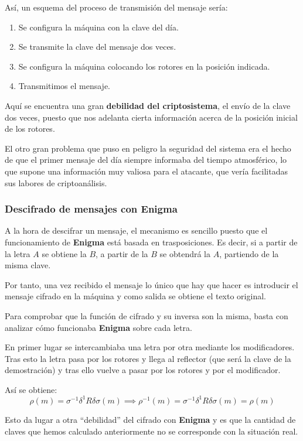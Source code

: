 \documentclass[nochap]{apuntesURJC}
\begin{document}
Así, un esquema del proceso de transmisión del mensaje sería:
\begin{enumerate}
\item Se configura la máquina con la clave del día.
\item Se transmite la clave del mensaje dos veces.
\item Se configura la máquina colocando los rotores en la posición indicada.
\item Transmitimos el mensaje.
\end{enumerate}

Aquí se encuentra una gran \textbf{debilidad del criptosistema}, el envío de la clave dos veces, puesto que nos adelanta cierta información acerca de la posición inicial de los rotores.

El otro gran problema que puso en peligro la seguridad del sistema era el hecho de que el primer mensaje del día siempre informaba del tiempo atmosférico, lo que supone una información muy valiosa para el atacante, que vería facilitadas sus labores de criptoanálisis.


\subsubsection{Descifrado de mensajes con Enigma}
A la hora de descifrar un mensaje, el mecanismo es sencillo puesto que el funcionamiento de \textbf{Enigma} está basada en trasposiciones. Es decir, si a partir de la letra $A$ se obtiene la $B$, a partir de la $B$ se obtendrá la $A$, partiendo de la misma clave.

Por tanto, una vez recibido el mensaje lo único que hay que hacer es introducir el mensaje cifrado en la máquina y como salida se obtiene el texto original.

Para comprobar que la función de cifrado y su inversa son la misma, basta con analizar cómo funcionaba \textbf{Enigma} sobre cada letra.

En primer lugar se intercambiaba una letra por otra mediante los modificadores. Tras esto la letra pasa por los rotores y llega al reflector (que será la clave de la demostración) y tras ello vuelve a pasar por los rotores y por el modificador.

Así se obtiene:
\[\rho(m) = σ^{-1}δ^{1}Rδσ(m) \implies \rho^{-1}(m) = σ^{-1}δ^{1}Rδσ(m) = \rho(m)\]

Esto da lugar a otra ``debilidad'' del cifrado con \textbf{Enigma} y es que la cantidad de claves que hemos calculado anteriormente no se corresponde con la situación real.
\end{document}

